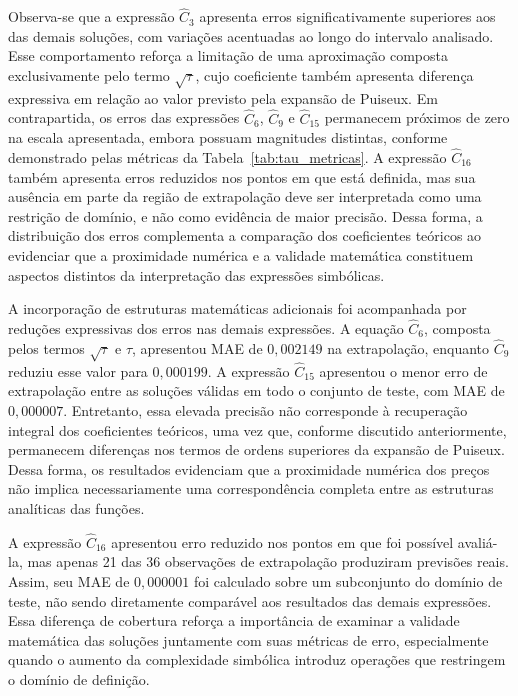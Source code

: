 Observa-se que a expressão $\widehat{C}_3$ apresenta erros significativamente superiores aos das demais soluções, com variações acentuadas ao longo do intervalo analisado. Esse comportamento reforça a limitação de uma aproximação composta exclusivamente pelo termo $\sqrt{\tau}$, cujo coeficiente também apresenta diferença expressiva em relação ao valor previsto pela expansão de Puiseux. Em contrapartida, os erros das expressões $\widehat{C}_6$, $\widehat{C}_9$ e $\widehat{C}_{15}$ permanecem próximos de zero na escala apresentada, embora possuam magnitudes distintas, conforme demonstrado pelas métricas da Tabela~\ref{tab:tau_metricas}. A expressão $\widehat{C}_{16}$ também apresenta erros reduzidos nos pontos em que está definida, mas sua ausência em parte da região de extrapolação deve ser interpretada como uma restrição de domínio, e não como evidência de maior precisão. Dessa forma, a distribuição dos erros complementa a comparação dos coeficientes teóricos ao evidenciar que a proximidade numérica e a validade matemática constituem aspectos distintos da interpretação das expressões simbólicas.

A incorporação de estruturas matemáticas adicionais foi acompanhada por reduções expressivas dos erros nas demais expressões. A equação $\widehat{C}_6$, composta pelos termos $\sqrt{\tau}$ e $\tau$, apresentou MAE de $0{,}002149$ na extrapolação, enquanto $\widehat{C}_9$ reduziu esse valor para $0{,}000199$. A expressão $\widehat{C}_{15}$ apresentou o menor erro de extrapolação entre as soluções válidas em todo o conjunto de teste, com MAE de $0{,}000007$. Entretanto, essa elevada precisão não corresponde à recuperação integral dos coeficientes teóricos, uma vez que, conforme discutido anteriormente, permanecem diferenças nos termos de ordens superiores da expansão de Puiseux. Dessa forma, os resultados evidenciam que a proximidade numérica dos preços não implica necessariamente uma correspondência completa entre as estruturas analíticas das funções.

A expressão $\widehat{C}_{16}$ apresentou erro reduzido nos pontos em que foi possível avaliá-la, mas apenas 21 das 36 observações de extrapolação produziram previsões reais. Assim, seu MAE de $0{,}000001$ foi calculado sobre um subconjunto do domínio de teste, não sendo diretamente comparável aos resultados das demais expressões. Essa diferença de cobertura reforça a importância de examinar a validade matemática das soluções juntamente com suas métricas de erro, especialmente quando o aumento da complexidade simbólica introduz operações que restringem o domínio de definição.

